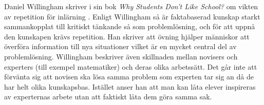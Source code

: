 %
%
%
%
%
\textcolor{turkos}{Daniel Willingham skriver i sin bok \textsl{Why Students Don't Like School?} om vikten av repetition för inlärning \cite{WhyDontStudents}. Enligt Willingham så är faktabaserad kunskap starkt sammankopplat till kritiskt tänkande så som problemlösning, och för att uppnå den kunskapen krävs repetition. Han skriver att övning hjälper människor att överföra information till nya situationer vilket är en mycket central del av problemlösning. Willingham beskriver även skillnaden mellan novisers och experters (till exempel matematiker) och deras olika arbetssätt. Det går inte att förvänta sig att novisen ska lösa samma problem som experten tar sig an då de har helt olika kunskapsbas. Istället anser han att man kan låta elever inspireras av experternas arbete utan att faktiskt låta dem göra samma sak. } 

